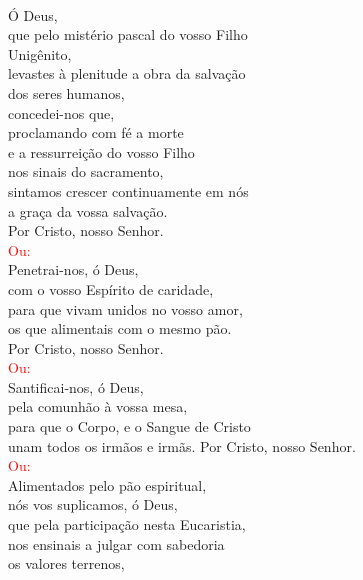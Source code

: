 \documentclass{book}
\begin{document}
\begin{flushleft}
    \vspace{.1cm} \\
    Ó Deus, \\
    que pelo mistério pascal do vosso Filho \\
    Unigênito, \\
    levastes à plenitude a obra da salvação \\
    dos seres humanos, \\
    concedei-nos que, \\
    proclamando com fé a morte \\
    e a ressurreição do vosso Filho \\
    nos sinais do sacramento, \\
    sintamos crescer continuamente em nós \\
    a graça da vossa salvação. \\
    Por Cristo, nosso Senhor.
    \vspace{.1cm} \\
    \textcolor{red}{Ou:}
    \vspace{.1cm} \\
    Penetrai-nos, ó Deus, \\
    com o vosso Espírito de caridade, \\
    para que vivam unidos no vosso amor, \\
    os que alimentais com o mesmo pão. \\
    Por Cristo, nosso Senhor.
    \vspace{.1cm} \\
    \textcolor{red}{Ou:}
    \vspace{.1cm} \\
    Santificai-nos, ó Deus, \\
    pela comunhão à vossa mesa, \\
    para que o Corpo, e o Sangue de Cristo \\
    unam todos os irmãos e irmãs.
    Por Cristo, nosso Senhor.
    \vspace{.1cm} \\
    \textcolor{red}{Ou:}
    \vspace{.1cm} \\
    Alimentados pelo pão espiritual, \\
    nós vos suplicamos, ó Deus, \\
    que pela participação nesta Eucaristia, \\
    nos ensinais a julgar com sabedoria \\
    os valores terrenos, \\

\end{flushleft}
\end{document}
